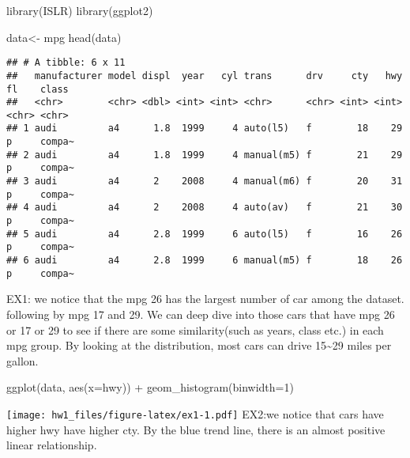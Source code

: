 \documentclass[
]{article}
\newenvironment{Shaded}{\begin{snugshade}}{\end{snugshade}}
\newcommand{\AttributeTok}[1]{\textcolor[rgb]{0.77,0.63,0.00}{#1}}
\newcommand{\DecValTok}[1]{\textcolor[rgb]{0.00,0.00,0.81}{#1}}
\newcommand{\FunctionTok}[1]{\textcolor[rgb]{0.00,0.00,0.00}{#1}}
\newcommand{\NormalTok}[1]{#1}
\newcommand{\OtherTok}[1]{\textcolor[rgb]{0.56,0.35,0.01}{#1}}
\newcommand{\SpecialCharTok}[1]{\textcolor[rgb]{0.00,0.00,0.00}{#1}}
\begin{document}
\begin{Shaded}
\begin{Highlighting}[]
\FunctionTok{library}\NormalTok{(ISLR)}
\FunctionTok{library}\NormalTok{(ggplot2)}
\end{Highlighting}
\end{Shaded}

\begin{Shaded}
\begin{Highlighting}[]
\NormalTok{data}\OtherTok{\textless{}{-}}\NormalTok{ mpg}
\FunctionTok{head}\NormalTok{(data)}
\end{Highlighting}
\end{Shaded}

\begin{verbatim}
## # A tibble: 6 x 11
##   manufacturer model displ  year   cyl trans      drv     cty   hwy fl    class 
##   <chr>        <chr> <dbl> <int> <int> <chr>      <chr> <int> <int> <chr> <chr> 
## 1 audi         a4      1.8  1999     4 auto(l5)   f        18    29 p     compa~
## 2 audi         a4      1.8  1999     4 manual(m5) f        21    29 p     compa~
## 3 audi         a4      2    2008     4 manual(m6) f        20    31 p     compa~
## 4 audi         a4      2    2008     4 auto(av)   f        21    30 p     compa~
## 5 audi         a4      2.8  1999     6 auto(l5)   f        16    26 p     compa~
## 6 audi         a4      2.8  1999     6 manual(m5) f        18    26 p     compa~
\end{verbatim}

EX1: we notice that the mpg 26 has the largest number of car among the
dataset. following by mpg 17 and 29. We can deep dive into those cars
that have mpg 26 or 17 or 29 to see if there are some similarity(such as
years, class etc.) in each mpg group. By looking at the distribution,
most cars can drive 15\textasciitilde29 miles per gallon.

\begin{Shaded}
\begin{Highlighting}[]
\FunctionTok{ggplot}\NormalTok{(data, }\FunctionTok{aes}\NormalTok{(}\AttributeTok{x=}\NormalTok{hwy)) }\SpecialCharTok{+} \FunctionTok{geom\_histogram}\NormalTok{(}\AttributeTok{binwidth=}\DecValTok{1}\NormalTok{)}
\end{Highlighting}
\end{Shaded}

\texttt{[image: hw1\_files/figure-latex/ex1-1.pdf]} EX2:we notice that
cars have higher hwy have higher cty. By the blue trend line, there is
an almost positive linear relationship.
\end{document}
